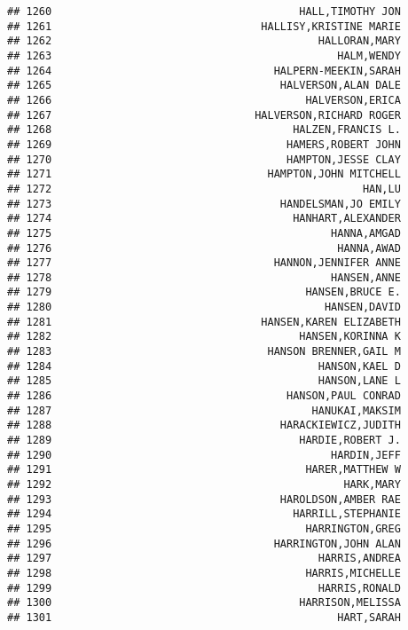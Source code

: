 \documentclass[
]{article}
\begin{document}
\begin{verbatim}
## 1260                                       HALL,TIMOTHY JON
## 1261                                 HALLISY,KRISTINE MARIE
## 1262                                          HALLORAN,MARY
## 1263                                             HALM,WENDY
## 1264                                   HALPERN-MEEKIN,SARAH
## 1265                                    HALVERSON,ALAN DALE
## 1266                                        HALVERSON,ERICA
## 1267                                HALVERSON,RICHARD ROGER
## 1268                                      HALZEN,FRANCIS L.
## 1269                                     HAMERS,ROBERT JOHN
## 1270                                     HAMPTON,JESSE CLAY
## 1271                                  HAMPTON,JOHN MITCHELL
## 1272                                                 HAN,LU
## 1273                                    HANDELSMAN,JO EMILY
## 1274                                      HANHART,ALEXANDER
## 1275                                            HANNA,AMGAD
## 1276                                             HANNA,AWAD
## 1277                                   HANNON,JENNIFER ANNE
## 1278                                            HANSEN,ANNE
## 1279                                        HANSEN,BRUCE E.
## 1280                                           HANSEN,DAVID
## 1281                                 HANSEN,KAREN ELIZABETH
## 1282                                       HANSEN,KORINNA K
## 1283                                  HANSON BRENNER,GAIL M
## 1284                                          HANSON,KAEL D
## 1285                                          HANSON,LANE L
## 1286                                     HANSON,PAUL CONRAD
## 1287                                         HANUKAI,MAKSIM
## 1288                                    HARACKIEWICZ,JUDITH
## 1289                                       HARDIE,ROBERT J.
## 1290                                            HARDIN,JEFF
## 1291                                        HARER,MATTHEW W
## 1292                                              HARK,MARY
## 1293                                    HAROLDSON,AMBER RAE
## 1294                                      HARRILL,STEPHANIE
## 1295                                        HARRINGTON,GREG
## 1296                                   HARRINGTON,JOHN ALAN
## 1297                                          HARRIS,ANDREA
## 1298                                        HARRIS,MICHELLE
## 1299                                          HARRIS,RONALD
## 1300                                       HARRISON,MELISSA
## 1301                                             HART,SARAH

\end{verbatim}
\end{document}
